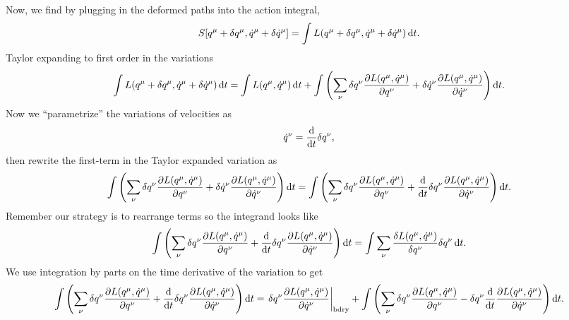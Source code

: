 Now, we find by plugging in the deformed paths into the action integral,
\begin{equation}
  S[q^{\mu} + \delta q^{\mu}, \dot{q}^{\mu} + \delta\dot{q}^{\mu}]
  = \int L(q^{\mu} + \delta q^{\mu}, \dot{q}^{\mu} + \delta\dot{q}^{\mu})\,\mathrm{d} t.
\end{equation}
Taylor expanding to first order in the variations
\begin{equation}
\int L(q^{\mu} + \delta q^{\mu}, \dot{q}^{\mu} +
\delta\dot{q}^{\mu})\,\mathrm{d} t
= \int L(q^{\mu}, \dot{q}^{\mu})\,\mathrm{d} t
+ \int \left(\sum_{\nu} \delta q^{\nu}\frac{\partial L(q^{\mu}, \dot{q}^{\mu})}{\partial q^{\nu}}
+\delta \dot{q}^{\nu}\frac{\partial L(q^{\mu}, \dot{q}^{\mu})}{\partial \dot{q}^{\nu}}\right)\mathrm{d} t.
\end{equation}
Now we ``parametrize'' the variations of velocities as
\begin{equation}
\dot{q}^{\nu} = \frac{\mathrm{d}}{\mathrm{d} t}\delta q^{\nu},
\end{equation}
then rewrite the first-term in the Taylor expanded variation as
\begin{equation}
\int \left(\sum_{\nu} \delta q^{\nu}\frac{\partial L(q^{\mu}, \dot{q}^{\mu})}{\partial q^{\nu}}
+\delta \dot{q}^{\nu}\frac{\partial L(q^{\mu}, \dot{q}^{\mu})}{\partial \dot{q}^{\nu}}\right)\mathrm{d} t
= \int \left(\sum_{\nu} \delta q^{\nu}\frac{\partial L(q^{\mu}, \dot{q}^{\mu})}{\partial q^{\nu}}
+\frac{\mathrm{d}}{\mathrm{d} t}\delta q^{\nu}\frac{\partial L(q^{\mu}, \dot{q}^{\mu})}{\partial \dot{q}^{\nu}}\right)\mathrm{d} t.
\end{equation}
Remember our strategy is to rearrange terms so the integrand looks like
\begin{equation}
\int \left(\sum_{\nu} \delta q^{\nu}\frac{\partial L(q^{\mu}, \dot{q}^{\mu})}{\partial q^{\nu}}
+\frac{\mathrm{d}}{\mathrm{d} t}\delta q^{\nu}\frac{\partial L(q^{\mu}, \dot{q}^{\mu})}{\partial \dot{q}^{\nu}}\right)\mathrm{d} t
= \int\sum_{\nu}\frac{\delta L(q^{\mu},
    \dot{q}^{\mu})}{\delta q^{\nu}}\delta q^{\nu}\,\mathrm{d} t.
\end{equation}
We use integration by parts on the time derivative of the variation to get
\begin{equation}
\int \left(\sum_{\nu} \delta q^{\nu}\frac{\partial L(q^{\mu}, \dot{q}^{\mu})}{\partial q^{\nu}}
+\frac{\mathrm{d}}{\mathrm{d} t}\delta q^{\nu}\frac{\partial L(q^{\mu}, \dot{q}^{\mu})}{\partial \dot{q}^{\nu}}\right)\mathrm{d} t
=\left.\delta q^{\nu}\frac{\partial L(q^{\mu}, \dot{q}^{\mu})}{\partial \dot{q}^{\nu}}\right|_{\text{bdry}}
+\int \left(\sum_{\nu} \delta q^{\nu}\frac{\partial L(q^{\mu}, \dot{q}^{\mu})}{\partial q^{\nu}}
-\delta q^{\nu}\frac{\mathrm{d}}{\mathrm{d} t}\frac{\partial L(q^{\mu}, \dot{q}^{\mu})}{\partial \dot{q}^{\nu}}\right)\mathrm{d} t.
\end{equation}
